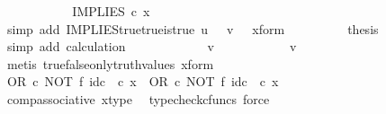 \begin{isabellebody}
\ \ \ \ \ \ \isamarkupfalse%
\ \isamarkupfalse%
\ {\isachardoublequoteopen}{\isachardot}{\kern0pt}{\isachardot}{\kern0pt}{\isachardot}{\kern0pt}\ {\isacharequal}{\kern0pt}\ IMPLIES\ {\isasymcirc}\isactrlsub c\ x{\isachardoublequoteclose}\isanewline
\ \ \ \ \ \ \ \ \isamarkupfalse%
\ {\isacharparenleft}{\kern0pt}simp\ add{\isacharcolon}{\kern0pt}\ IMPLIES{\isacharunderscore}{\kern0pt}true{\isacharunderscore}{\kern0pt}true{\isacharunderscore}{\kern0pt}is{\isacharunderscore}{\kern0pt}true\ {\isacartoucheopen}u\ {\isacharequal}{\kern0pt}\ {\isasymt}{\isacartoucheclose}\ {\isacartoucheopen}v\ {\isacharequal}{\kern0pt}\ {\isasymt}{\isacartoucheclose}\ x{\isacharunderscore}{\kern0pt}form{\isacharparenright}{\kern0pt}\isanewline
\ \ \ \ \ \ \isamarkupfalse%
\ \isamarkupfalse%
\ {\isacharquery}{\kern0pt}thesis\isanewline
\ \ \ \ \ \ \ \ \isamarkupfalse%
\ {\isacharparenleft}{\kern0pt}simp\ add{\isacharcolon}{\kern0pt}\ calculation{\isacharparenright}{\kern0pt}\isanewline
\ \ \ \ \isamarkupfalse%
\isanewline
\ \ \ \ \ \ \isamarkupfalse%
\ {\isachardoublequoteopen}v\ {\isasymnoteq}\ {\isasymt}{\isachardoublequoteclose}\isanewline
\ \ \ \ \ \ \isamarkupfalse%
\ \isamarkupfalse%
\ {\isachardoublequoteopen}v\ {\isacharequal}{\kern0pt}\ {\isasymf}{\isachardoublequoteclose}\isanewline
\ \ \ \ \ \ \ \ \isamarkupfalse%
\ {\isacharparenleft}{\kern0pt}metis\ true{\isacharunderscore}{\kern0pt}false{\isacharunderscore}{\kern0pt}only{\isacharunderscore}{\kern0pt}truth{\isacharunderscore}{\kern0pt}values\ x{\isacharunderscore}{\kern0pt}form{\isacharparenright}{\kern0pt}\isanewline
\ \ \ \ \ \ \isamarkupfalse%
\ {\isachardoublequoteopen}{\isacharparenleft}{\kern0pt}OR\ {\isasymcirc}\isactrlsub c\ NOT\ {\isasymtimes}\isactrlsub f\ id\isactrlsub c\ {\isasymOmega}{\isacharparenright}{\kern0pt}\ {\isasymcirc}\isactrlsub c\ x\ {\isacharequal}{\kern0pt}\ OR\ {\isasymcirc}\isactrlsub c\ {\isacharparenleft}{\kern0pt}NOT\ {\isasymtimes}\isactrlsub f\ id\isactrlsub c\ {\isasymOmega}{\isacharparenright}{\kern0pt}\ {\isasymcirc}\isactrlsub c\ x{\isachardoublequoteclose}\isanewline
\ \ \ \ \ \ \ \ \isamarkupfalse%
\ comp{\isacharunderscore}{\kern0pt}associative{}\ x{\isacharunderscore}{\kern0pt}type\ \isamarkupfalse%
\ {\isacharparenleft}{\kern0pt}typecheck{\isacharunderscore}{\kern0pt}cfuncs{\isacharcomma}{\kern0pt}\ force{\isacharparenright}{\kern0pt}\isanewline

\end{isabellebody}
